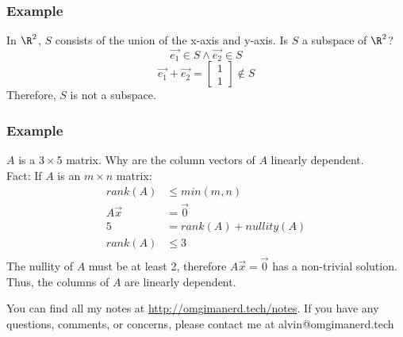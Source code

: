 \documentclass[letterpaper, 12pt]{math}
\begin{document}
\subsubsection*{Example}
In \( \R^2 \), \( S \) consists of the union of the x-axis and y-axis. Is
\( S \) a subspace of \( \R^2 \)?
\[ \vec{e_1}\in S \wedge \vec{e_2}\in S \]
\[ \vec{e_1}+\vec{e_2} = \begin{bmatrix}1 \\ 1\end{bmatrix}\notin S \]
Therefore, \( S \) is not a subspace.

\subsubsection*{Example}
\( A \) is a \( 3\times 5 \) matrix. Why are the column vectors of \( A \)
linearly dependent. \\
Fact: If \( A \) is an \( m\times n \) matrix:
\begin{align*}
  rank(A) &\le min(m,n) \\
  A\vec{x} &= \vec{0} \\
  5 &= rank(A)+nullity(A) \\
  rank(A) &\le 3 \\
\end{align*}
The nullity of \( A \) must be at least 2, therefore \( A\vec{x} = \vec{0} \)
has a non-trivial solution. Thus, the columns of \( A \) are linearly
dependent.

\begin{center}
  You can find all my notes at \url{http://omgimanerd.tech/notes}. If you have
  any questions, comments, or concerns, please contact me at
  alvin@omgimanerd.tech
\end{center}
\end{document}
